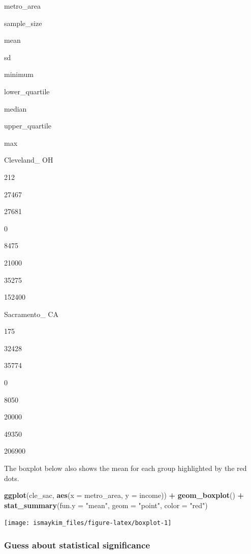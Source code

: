 \documentclass[12pt,]{krantz}
\makeatletter
\newenvironment{Shaded}{\begin{snugshade}}{\end{snugshade}}
\newcommand{\KeywordTok}[1]{\textcolor[rgb]{0.27,0.27,0.27}{\textbf{#1}}}
\newcommand{\DataTypeTok}[1]{\textcolor[rgb]{0.27,0.27,0.27}{#1}}
\newcommand{\StringTok}[1]{\textcolor[rgb]{0.5,0.5,0.5}{#1}}
\newcommand{\OperatorTok}[1]{\textcolor[rgb]{0.43,0.43,0.43}{\textbf{#1}}}
\newcommand{\NormalTok}[1]{#1}
\newenvironment{kframe}{%
\medskip{}
\setlength{\fboxsep}{.8em}
 \def\at@end@of@kframe{}%
 \ifinner\ifhmode%
  \def\at@end@of@kframe{\end{minipage}}%
  \begin{minipage}{\columnwidth}%
 \fi\fi%
 \def\FrameCommand##1{\hskip\@totalleftmargin \hskip-\fboxsep
 \colorbox{shadecolor}{##1}\hskip-\fboxsep
     \hskip-\linewidth \hskip-\@totalleftmargin \hskip\columnwidth}%
 \MakeFramed {\advance\hsize-\width
   \@totalleftmargin\z@ \linewidth\hsize
   \@setminipage}}%
 {\par\unskip\endMakeFramed%
 \at@end@of@kframe}
\renewenvironment{Shaded}{\begin{kframe}}{\end{kframe}}
\makeatother
\begin{document}
metro\_area

sample\_size

mean

sd

minimum

lower\_quartile

median

upper\_quartile

max

Cleveland\_ OH

212

27467

27681

0

8475

21000

35275

152400

Sacramento\_ CA

175

32428

35774

0

8050

20000

49350

206900

The boxplot below also shows the mean for each group highlighted by the
red dots.

\begin{Shaded}
\begin{Highlighting}[]
\KeywordTok{ggplot}\NormalTok{(cle_sac, }\KeywordTok{aes}\NormalTok{(}\DataTypeTok{x =}\NormalTok{ metro_area, }\DataTypeTok{y =}\NormalTok{ income)) }\OperatorTok{+}
\StringTok{  }\KeywordTok{geom_boxplot}\NormalTok{() }\OperatorTok{+}
\StringTok{  }\KeywordTok{stat_summary}\NormalTok{(}\DataTypeTok{fun.y =} \StringTok{"mean"}\NormalTok{, }\DataTypeTok{geom =} \StringTok{"point"}\NormalTok{, }\DataTypeTok{color =} \StringTok{"red"}\NormalTok{)}
\end{Highlighting}
\end{Shaded}

\begin{center}\texttt{[image: ismaykim\_files/figure-latex/boxplot-1]} \end{center}

\subsubsection*{Guess about statistical
significance}\label{guess-about-statistical-significance-3}
\end{document}
